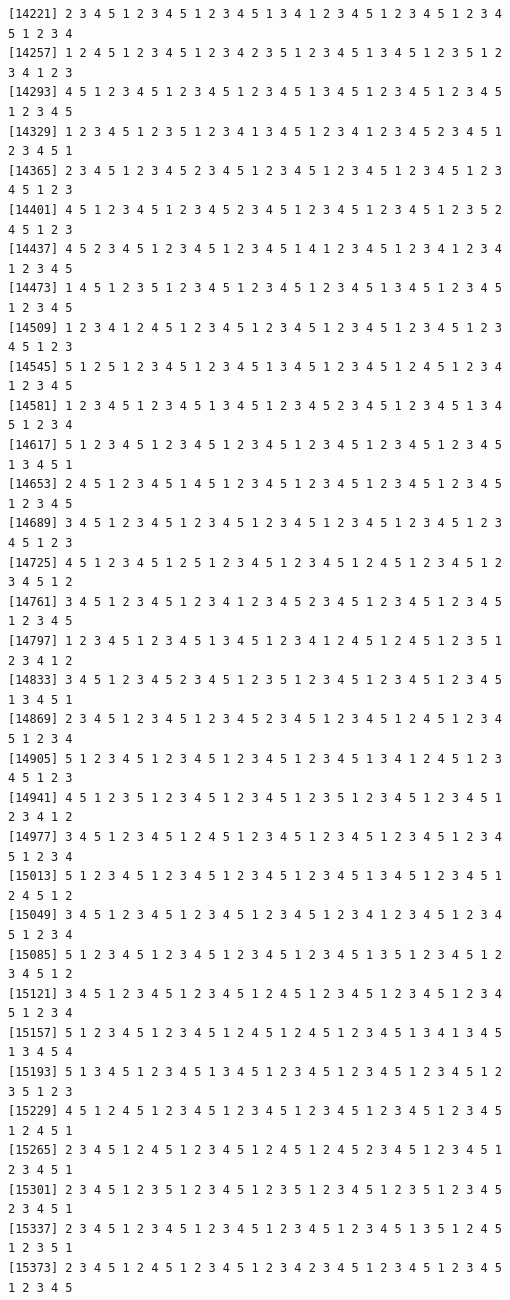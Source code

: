 \documentclass[
  english,
]{book}
\begin{document}
\begin{verbatim}
[14221] 2 3 4 5 1 2 3 4 5 1 2 3 4 5 1 3 4 1 2 3 4 5 1 2 3 4 5 1 2 3 4 5 1 2 3 4
[14257] 1 2 4 5 1 2 3 4 5 1 2 3 4 2 3 5 1 2 3 4 5 1 3 4 5 1 2 3 5 1 2 3 4 1 2 3
[14293] 4 5 1 2 3 4 5 1 2 3 4 5 1 2 3 4 5 1 3 4 5 1 2 3 4 5 1 2 3 4 5 1 2 3 4 5
[14329] 1 2 3 4 5 1 2 3 5 1 2 3 4 1 3 4 5 1 2 3 4 1 2 3 4 5 2 3 4 5 1 2 3 4 5 1
[14365] 2 3 4 5 1 2 3 4 5 2 3 4 5 1 2 3 4 5 1 2 3 4 5 1 2 3 4 5 1 2 3 4 5 1 2 3
[14401] 4 5 1 2 3 4 5 1 2 3 4 5 2 3 4 5 1 2 3 4 5 1 2 3 4 5 1 2 3 5 2 4 5 1 2 3
[14437] 4 5 2 3 4 5 1 2 3 4 5 1 2 3 4 5 1 4 1 2 3 4 5 1 2 3 4 1 2 3 4 1 2 3 4 5
[14473] 1 4 5 1 2 3 5 1 2 3 4 5 1 2 3 4 5 1 2 3 4 5 1 3 4 5 1 2 3 4 5 1 2 3 4 5
[14509] 1 2 3 4 1 2 4 5 1 2 3 4 5 1 2 3 4 5 1 2 3 4 5 1 2 3 4 5 1 2 3 4 5 1 2 3
[14545] 5 1 2 5 1 2 3 4 5 1 2 3 4 5 1 3 4 5 1 2 3 4 5 1 2 4 5 1 2 3 4 1 2 3 4 5
[14581] 1 2 3 4 5 1 2 3 4 5 1 3 4 5 1 2 3 4 5 2 3 4 5 1 2 3 4 5 1 3 4 5 1 2 3 4
[14617] 5 1 2 3 4 5 1 2 3 4 5 1 2 3 4 5 1 2 3 4 5 1 2 3 4 5 1 2 3 4 5 1 3 4 5 1
[14653] 2 4 5 1 2 3 4 5 1 4 5 1 2 3 4 5 1 2 3 4 5 1 2 3 4 5 1 2 3 4 5 1 2 3 4 5
[14689] 3 4 5 1 2 3 4 5 1 2 3 4 5 1 2 3 4 5 1 2 3 4 5 1 2 3 4 5 1 2 3 4 5 1 2 3
[14725] 4 5 1 2 3 4 5 1 2 5 1 2 3 4 5 1 2 3 4 5 1 2 4 5 1 2 3 4 5 1 2 3 4 5 1 2
[14761] 3 4 5 1 2 3 4 5 1 2 3 4 1 2 3 4 5 2 3 4 5 1 2 3 4 5 1 2 3 4 5 1 2 3 4 5
[14797] 1 2 3 4 5 1 2 3 4 5 1 3 4 5 1 2 3 4 1 2 4 5 1 2 4 5 1 2 3 5 1 2 3 4 1 2
[14833] 3 4 5 1 2 3 4 5 2 3 4 5 1 2 3 5 1 2 3 4 5 1 2 3 4 5 1 2 3 4 5 1 3 4 5 1
[14869] 2 3 4 5 1 2 3 4 5 1 2 3 4 5 2 3 4 5 1 2 3 4 5 1 2 4 5 1 2 3 4 5 1 2 3 4
[14905] 5 1 2 3 4 5 1 2 3 4 5 1 2 3 4 5 1 2 3 4 5 1 3 4 1 2 4 5 1 2 3 4 5 1 2 3
[14941] 4 5 1 2 3 5 1 2 3 4 5 1 2 3 4 5 1 2 3 5 1 2 3 4 5 1 2 3 4 5 1 2 3 4 1 2
[14977] 3 4 5 1 2 3 4 5 1 2 4 5 1 2 3 4 5 1 2 3 4 5 1 2 3 4 5 1 2 3 4 5 1 2 3 4
[15013] 5 1 2 3 4 5 1 2 3 4 5 1 2 3 4 5 1 2 3 4 5 1 3 4 5 1 2 3 4 5 1 2 4 5 1 2
[15049] 3 4 5 1 2 3 4 5 1 2 3 4 5 1 2 3 4 5 1 2 3 4 1 2 3 4 5 1 2 3 4 5 1 2 3 4
[15085] 5 1 2 3 4 5 1 2 3 4 5 1 2 3 4 5 1 2 3 4 5 1 3 5 1 2 3 4 5 1 2 3 4 5 1 2
[15121] 3 4 5 1 2 3 4 5 1 2 3 4 5 1 2 4 5 1 2 3 4 5 1 2 3 4 5 1 2 3 4 5 1 2 3 4
[15157] 5 1 2 3 4 5 1 2 3 4 5 1 2 4 5 1 2 4 5 1 2 3 4 5 1 3 4 1 3 4 5 1 3 4 5 4
[15193] 5 1 3 4 5 1 2 3 4 5 1 3 4 5 1 2 3 4 5 1 2 3 4 5 1 2 3 4 5 1 2 3 5 1 2 3
[15229] 4 5 1 2 4 5 1 2 3 4 5 1 2 3 4 5 1 2 3 4 5 1 2 3 4 5 1 2 3 4 5 1 2 4 5 1
[15265] 2 3 4 5 1 2 4 5 1 2 3 4 5 1 2 4 5 1 2 4 5 2 3 4 5 1 2 3 4 5 1 2 3 4 5 1
[15301] 2 3 4 5 1 2 3 5 1 2 3 4 5 1 2 3 5 1 2 3 4 5 1 2 3 5 1 2 3 4 5 2 3 4 5 1
[15337] 2 3 4 5 1 2 3 4 5 1 2 3 4 5 1 2 3 4 5 1 2 3 4 5 1 3 5 1 2 4 5 1 2 3 5 1
[15373] 2 3 4 5 1 2 4 5 1 2 3 4 5 1 2 3 4 2 3 4 5 1 2 3 4 5 1 2 3 4 5 1 2 3 4 5

\end{verbatim}
\end{document}
